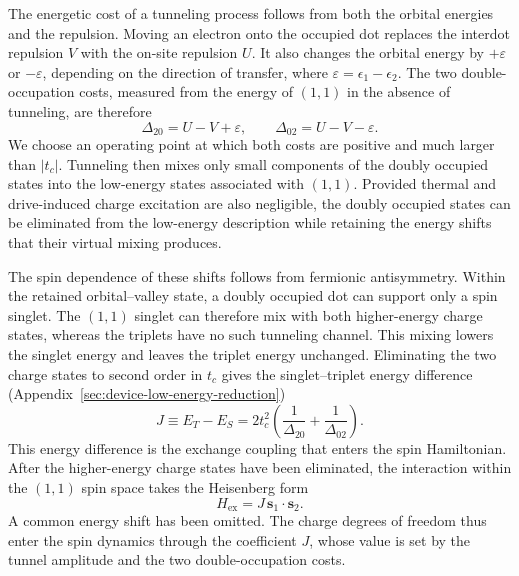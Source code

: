 The energetic cost of a tunneling process follows from both the
orbital energies and the repulsion. Moving an electron onto the
occupied dot replaces the interdot repulsion $V$ with the on-site
repulsion $U$. It also changes the orbital energy by
$+\varepsilon$ or $-\varepsilon$, depending on the direction of
transfer, where $\varepsilon=\epsilon_1-\epsilon_2$.
The two double-occupation costs, measured from the energy of $(1,1)$
in the absence of tunneling, are therefore
\begin{equation}
  \Delta_{20}=U-V+\varepsilon,\qquad
  \Delta_{02}=U-V-\varepsilon.
  \label{eq:virtual-charge-gaps}
\end{equation}
We choose an operating point at which both costs are positive and
much larger than $|t_c|$. Tunneling then mixes only small components
of the doubly occupied states into the low-energy states associated
with $(1,1)$. Provided thermal and drive-induced charge excitation
are also negligible, the doubly occupied states can be eliminated
from the low-energy description while retaining the energy shifts
that their virtual mixing produces.

The spin dependence of these shifts follows from fermionic
antisymmetry. Within the retained orbital--valley state, a doubly
occupied dot can support only a spin singlet. The $(1,1)$ singlet
can therefore mix with both higher-energy charge states, whereas
the triplets have no such tunneling channel. This mixing lowers
the singlet energy and leaves the triplet energy unchanged.
Eliminating the two charge states to second order in $t_c$ gives
the singlet--triplet energy difference
(Appendix~\ref{sec:device-low-energy-reduction})
\begin{equation}
  J\equiv E_T-E_S
     =2t_c^2\left(\frac{1}{\Delta_{20}}+\frac{1}{\Delta_{02}}\right).
  \label{eq:superexchange}
\end{equation}
This energy difference is the exchange coupling that enters the
spin Hamiltonian. After the higher-energy charge states have been
eliminated, the interaction within the $(1,1)$ spin space takes
the Heisenberg form~\cite{Loss1998}
\begin{equation}
  H_{\mathrm{ex}}=J\,\mathbf{s}_1\cdot\mathbf{s}_2.
  \label{eq:exchange-spin}
\end{equation}
A common energy shift has been omitted. The charge degrees of freedom
thus enter the spin dynamics through the coefficient $J$, whose value
is set by the tunnel amplitude and the two double-occupation costs.

